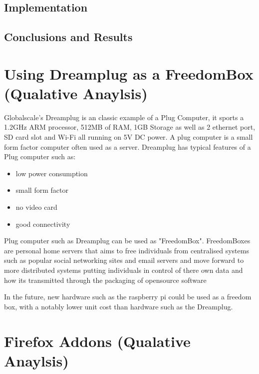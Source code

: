 \documentclass[12pt,a4paper,oneside]{article}
\begin{document}
{%

\subsection{Implementation}

\subsection{Conclusions and Results}


\section{Using Dreamplug as a FreedomBox (Qualative Anaylsis)}

Globalscale's Dreamplug is an classic example of a Plug Computer, it sports a 1.2GHz ARM processor, 512MB of RAM, 1GB Storage as well as 2 ethernet port, SD card slot and Wi-Fi all running on 5V DC power. A plug computer is a small form factor computer often used as a server. Dreamplug has typical features of a Plug computer such as:

\begin{itemize}
\item low power consumption
\item small form factor
\item no video card
\item good connectivity
\end{itemize}

Plug computer such as Dreamplug can be used as "FreedomBox". FreedomBoxes are personal home servers that aims to free individuals from centralised systems such as popular social networking sites and email servers and move forward to more distributed systems putting individuals in control of there own data and how its transmitted through the packaging of opensource software 

In the future, new hardware such as the raspberry pi could be used as a freedom box, with a notably lower unit cost than hardware such as the Dreamplug.

\section{Firefox Addons (Qualative Anaylsis)}

}
\end{document}
